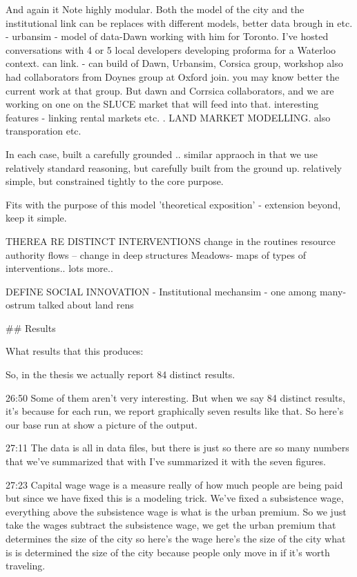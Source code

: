 And again it Note highly modular. Both the model of the city and the institutional link can be replaces with different models, better data brough in etc. - urbansim - model of data-Dawn working with him for Toronto. I've hosted conversations with 4 or 5 local developers developing proforma for a Waterloo context.  can link. 
- can build of Dawn, Urbansim, Corsica group, workshop also had collaborators from Doynes group at Oxford join. you may know better the current work at that group. But dawn and Corrsica collaborators, and we are working on one on the SLUCE market that will feed into that. interesting features - linking rental markets etc. .
LAND MARKET MODELLING.
also transporation etc.

In each case, built a carefully grounded .. similar appraoch in that we use relatively standard reasoning, but carefully built from the ground up. 
relatively simple, but constrained tightly to the core purpose.

Fits with the purpose of this model 'theoretical exposition' - extension beyond, keep it simple.

THEREA RE DISTINCT INTERVENTIONS
change in the routines resource authority flows -- change in deep structures
Meadows- maps of types of interventions.. lots more.. 

DEFINE SOCIAL INNOVATION - 
Institutional mechansim - one among many- ostrum talked about land rens



## Results


What results that this produces:

So, in the thesis we actually report 84 distinct results.

26:50
Some of them aren't very interesting. But when we say 84 distinct results, it's because for each run, we report graphically seven results like that. So here's our base run at show a picture of the output.

27:11
The data is all in data files, but there is just so there are so many numbers that we've summarized that with I've summarized it with the seven figures.

27:23
Capital wage wage is a measure really of how much people are being paid but since we have fixed this is a modeling trick. We've fixed a subsistence wage, everything above the subsistence wage is what is the urban premium. So we just take the wages subtract the subsistence wage, we get the urban premium that determines the size of the city so here's the wage here's the size of the city what is is determined the size of the city because people only move in if it's worth traveling. 

